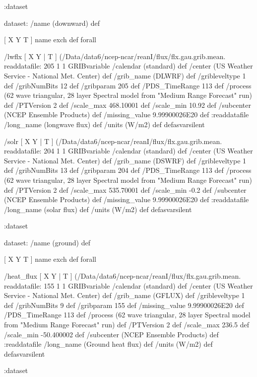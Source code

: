 \begin{ingrid}
  :dataset

  dataset: /name (downward) def

   [ X Y T ] { name exch def } forall

   /lwflx { [ X Y | T ] (/Data/data6/ncep-ncar/reanI/flux/flx.gau.grib.mean.%
   readdatafile:
   205 1 1 GRIBvariable
   /calendar (standard) def
   /center (US Weather Service - National Met. Center) def
   /grib_name (DLWRF) def
   /gribleveltype 1 def
   /gribNumBits 12 def
   /gribparam 205 def
   /PDS_TimeRange 113 def
   /process (62 wave triangular, 28 layer Spectral model from "Medium Range Forecast" run) def
   /PTVersion 2 def
   /scale_max 468.10001 def
   /scale_min 10.92 def
   /subcenter (NCEP Ensemble Products) def
   /missing_value 9.99900026E20 def
   :readdatafile
   /long_name (longwave flux) def
   /units (W/m2) def
   } defasvarsilent

   /solr { [ X Y | T ] (/Data/data6/ncep-ncar/reanI/flux/flx.gau.grib.mean.%
   readdatafile:
   204 1 1 GRIBvariable
   /calendar (standard) def
   /center (US Weather Service - National Met. Center) def
   /grib_name (DSWRF) def
   /gribleveltype 1 def
   /gribNumBits 13 def
   /gribparam 204 def
   /PDS_TimeRange 113 def
   /process (62 wave triangular, 28 layer Spectral model from "Medium Range Forecast" run) def
   /PTVersion 2 def
   /scale_max 535.70001 def
   /scale_min -0.2 def
   /subcenter (NCEP Ensemble Products) def
   /missing_value 9.99900026E20 def
   :readdatafile
   /long_name (solar flux) def
   /units (W/m2) def
   } defasvarsilent

  :dataset

  dataset: /name (ground) def

   [ X Y T ] { name exch def } forall

   /heat_flux { [ X Y | T ] (/Data/data6/ncep-ncar/reanI/flux/flx.gau.grib.mean.%
   readdatafile:
   155 1 1 GRIBvariable
   /calendar (standard) def
   /center (US Weather Service - National Met. Center) def
   /grib_name (GFLUX) def
   /gribleveltype 1 def
   /gribNumBits 9 def
   /gribparam 155 def
   /missing_value 9.99900026E20 def
   /PDS_TimeRange 113 def
   /process (62 wave triangular, 28 layer Spectral model from "Medium Range Forecast" run) def
   /PTVersion 2 def
   /scale_max 236.5 def
   /scale_min -50.400002 def
   /subcenter (NCEP Ensemble Products) def
   :readdatafile
   /long_name (Ground heat flux) def
   /units (W/m2) def
   } defasvarsilent

  :dataset


\end{ingrid}
